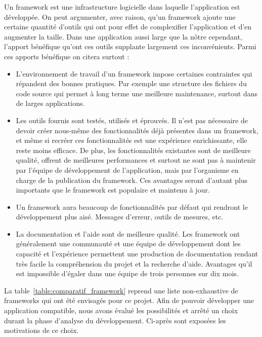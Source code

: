 \documentclass{EPL-master-thesis-covers-FR}
\begin{document}
				Un framework est une infrastructure logicielle dans laquelle l'application est développée. On peut argumenter, avec raison, qu'un framework ajoute une certaine quantité d'outils qui ont pour effet de complexifier l'application et d'en augmenter la taille. Dans une application aussi large que la nôtre cependant, l'apport bénéfique qu'ont ces outils supplante largement ces inconvénients. Parmi ces apports bénéfique on citera surtout :
				\begin{itemize}
					\item L'environnement de travail d'un framework impose certaines contraintes qui répandent des bonnes pratiques. Par exemple une structure des fichiers du code source qui permet à long terme une meilleure maintenance, surtout dans de larges applications.
					\item Les outils fournis sont testés, utilisés et éprouvés. Il n'est pas nécessaire de devoir créer nous-même des fonctionnalités déjà présentes dans un framework, et même si recréer ces fonctionnalités est une expérience enrichissante, elle reste moins efficace. De plus, les fonctionnalités existantes sont de meilleure qualité, offrent de meilleures performances et surtout ne sont pas à maintenir par l'équipe de développement de l'application, mais par l'organisme en charge de la publication du framework. Ces avantages seront d'autant plus importants que le framework est populaire et maintenu à jour.
					\item Un framework aura beaucoup de fonctionnalités par défaut qui rendront le développement plus aisé. Messages d'erreur, outils de mesures, etc.
					\item La documentation et l'aide sont de meilleure qualité. Les framework ont généralement une communauté et une équipe de développement dont les capacité et l'expérience permettent une production de documentation rendant très facile la compréhension du projet et la recherche d'aide. Avantages qu'il est impossible d'égaler dans une équipe de trois personnes sur dix mois.
				\end{itemize}

				La table~\ref{table:comparatif_framework} reprend une liste non-exhaustive de frameworks qui ont été envisagés pour ce projet. Afin de pouvoir développer une application compatible, nous avons évalué les possibilités et arrêté un choix durant la phase d'analyse du développement. Ci-après sont exposées les motivations de ce choix.
\end{document}

